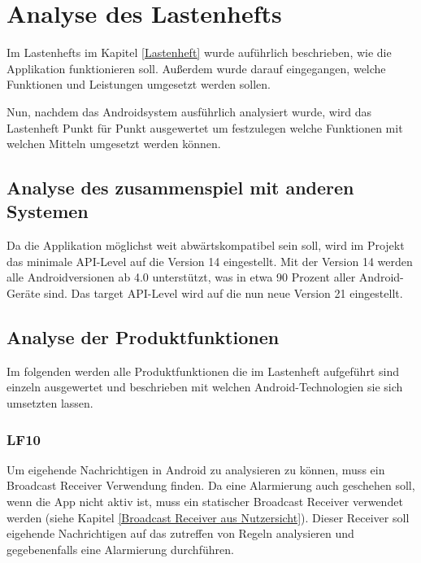 \section{Analyse des Lastenhefts}
Im Lastenhefts im Kapitel \ref{Lastenheft} wurde auf\"uhrlich beschrieben, wie die Applikation funktionieren soll. Au\ss{}erdem wurde darauf eingegangen, welche Funktionen und Leistungen umgesetzt werden sollen. 

Nun, nachdem das Androidsystem ausf\"uhrlich analysiert wurde, wird das Lastenheft Punkt f\"ur Punkt ausgewertet um festzulegen welche Funktionen mit welchen Mitteln umgesetzt werden k\"onnen.

\subsection{Analyse des zusammenspiel mit anderen Systemen}
Da die Applikation m\"oglichst weit abw\"artskompatibel sein soll, wird im Projekt das minimale API-Level auf die Version 14 eingestellt. Mit der Version 14 werden alle Androidversionen ab 4.0 unterst\"utzt, was in etwa 90 Prozent aller Android-Ger\"ate sind. Das target API-Level wird auf die nun neue Version 21 eingestellt. \cite{AndroidVerteilung} 

\subsection{Analyse der Produktfunktionen}
Im folgenden werden alle Produktfunktionen die im Lastenheft aufgef\"uhrt sind einzeln ausgewertet und beschrieben mit welchen Android-Technologien sie sich umsetzten lassen.

\subsubsection{LF10}
Um eigehende Nachrichtigen in Android zu analysieren zu k\"onnen, muss ein Broadcast Receiver Verwendung finden. Da eine Alarmierung auch geschehen soll, wenn die App nicht aktiv ist, muss ein statischer Broadcast Receiver verwendet werden (siehe Kapitel \ref{Broadcast Receiver aus Nutzersicht}). Dieser Receiver soll eigehende Nachrichtigen auf das zutreffen von Regeln analysieren und gegebenenfalls eine Alarmierung durchf\"uhren. 

